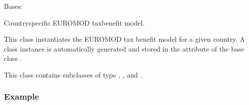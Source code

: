 \documentclass[letterpaper,10pt,english]{sphinxmanual}
\begin{document}
\begin{fulllineitems}
\label{\detokenize{autoapi/euromod/core/index:euromod.core.Country}}
\pysigstartsignatures
{}
\pysigstopsignatures
\sphinxAtStartPar
Bases: 

\sphinxAtStartPar
Country\sphinxhyphen{}specific EUROMOD tax\sphinxhyphen{}benefit model.

\sphinxAtStartPar
This class instantiates the EUROMOD tax benefit model for a given country.
A class instance is automatically generated and stored in the attribute
 of the base class {\hyperref[\detokenize{autoapi/euromod/core/index:euromod.core.Model}]{}}.

\sphinxAtStartPar
This class contains subclasses of type {\hyperref[\detokenize{autoapi/euromod/core/index:euromod.core.System}]{}}, {\hyperref[\detokenize{autoapi/euromod/core/index:euromod.core.Policy}]{}},
{\hyperref[\detokenize{autoapi/euromod/core/index:euromod.core.Dataset}]{}} and {\hyperref[\detokenize{autoapi/euromod/core/index:euromod.core.Extension}]{}}.
\subsubsection*{Example}

\begin{sphinxVerbatim}[commandchars=\\\{\}]
   
\PYG{p}{[}\PYG{p}{]}
\end{sphinxVerbatim}

\end{fulllineitems}
\end{document}
